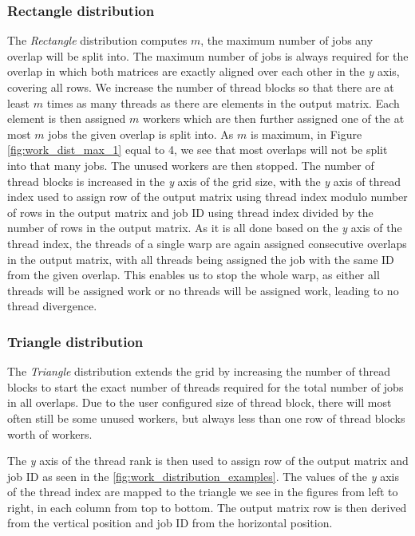 \subsubsection{Rectangle distribution}

The \textit{Rectangle} distribution computes $m$, the maximum number of jobs any overlap will be split into. The maximum number of jobs is always required for the overlap in which both matrices are exactly aligned over each other in the \textit{y} axis, covering all rows. We increase the number of thread blocks so that there are at least $m$ times as many threads as there are elements in the output matrix. Each element is then assigned $m$ workers which are then further assigned one of the at most $m$ jobs the given overlap is split into. As $m$ is maximum, in Figure \ref{fig:work_dist_max_1} equal to 4, we see that most overlaps will not be split into that many jobs. The unused workers are then stopped. The number of thread blocks is increased in the \textit{y} axis of the grid size, with the \textit{y} axis of thread index used to assign row of the output matrix using thread index modulo number of rows in the output matrix and job ID using thread index divided by the number of rows in the output matrix. As it is all done based on the \textit{y} axis of the thread index, the threads of a single warp are again assigned consecutive overlaps in the output matrix, with all threads being assigned the job with the same ID from the given overlap. This enables us to stop the whole warp, as either all threads will be assigned work or no threads will be assigned work, leading to no thread divergence.

\subsubsection{Triangle distribution}


The \textit{Triangle} distribution extends the grid by increasing the number of thread blocks to start the exact number of threads required for the total number of jobs in all overlaps. Due to the user configured size of thread block, there will most often still be some unused workers, but always less than one row of thread blocks worth of workers.

The \textit{y} axis of the thread rank is then used to assign row of the output matrix and job ID as seen in the \ref{fig:work_distribution_examples}. The values of the \textit{y} axis of the thread index are mapped to the triangle we see in the figures from left to right, in each column from top to bottom. The output matrix row is then derived from the vertical position and job ID from the horizontal position.

